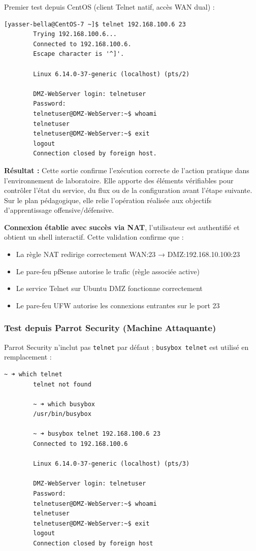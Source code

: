 \documentclass[12pt,a4paper,openany]{report}
\begin{document}
	Premier test depuis CentOS (client Telnet natif, accès WAN dual) :
	
	\begin{lstlisting}[caption=Test Telnet depuis CentOS via NAT]
		[yasser-bella@CentOS-7 ~]$ telnet 192.168.100.6 23
		Trying 192.168.100.6...
		Connected to 192.168.100.6.
		Escape character is '^]'.
		
		Linux 6.14.0-37-generic (localhost) (pts/2)
		
		DMZ-WebServer login: telnetuser
		Password:
		telnetuser@DMZ-WebServer:~$ whoami
		telnetuser
		telnetuser@DMZ-WebServer:~$ exit
		logout
		Connection closed by foreign host.
	\end{lstlisting}
	
	\textbf{Résultat :} Cette sortie confirme l'exécution correcte de l'action pratique dans l'environnement de laboratoire. Elle apporte des éléments vérifiables pour contrôler l'état du service, du flux ou de la configuration avant l'étape suivante. Sur le plan pédagogique, elle relie l'opération réalisée aux objectifs d'apprentissage offensive/défensive.
	
	
	\textcolor{green}{\checkmark} \textbf{Connexion établie avec succès via NAT}, l'utilisateur est authentifié
	et obtient un shell interactif. Cette validation confirme que :
	\begin{itemize}
		\item La règle NAT redirige correctement WAN:23 → DMZ:192.168.10.100:23
		\item Le pare-feu pfSense autorise le trafic (règle associée active)
		\item Le service Telnet sur Ubuntu DMZ fonctionne correctement
		\item Le pare-feu UFW autorise les connexions entrantes sur le port 23
	\end{itemize}
	
	\subsubsection{Test depuis Parrot Security (Machine Attaquante)}
	
	Parrot Security n'inclut pas \texttt{telnet} par défaut ; \texttt{busybox telnet} est utilisé en remplacement :
	
	\begin{lstlisting}[caption=Test Telnet depuis Parrot Security (busybox)]
		~ ➜ which telnet
		telnet not found
		
		~ ➜ which busybox
		/usr/bin/busybox
		
		~ ➜ busybox telnet 192.168.100.6 23
		Connected to 192.168.100.6
		
		Linux 6.14.0-37-generic (localhost) (pts/3)
		
		DMZ-WebServer login: telnetuser
		Password:
		telnetuser@DMZ-WebServer:~$ whoami
		telnetuser
		telnetuser@DMZ-WebServer:~$ exit
		logout
		Connection closed by foreign host
	\end{lstlisting}
	
\end{document}
